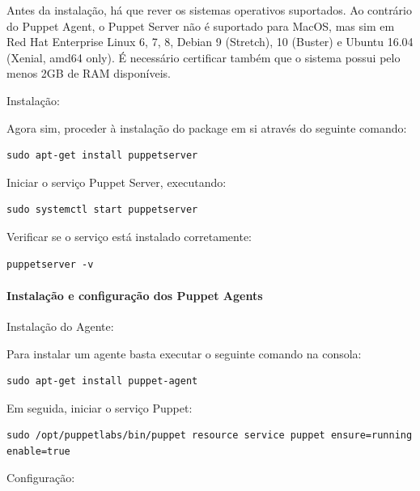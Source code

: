 \documentclass{article}
\begin{document}
Antes da instalação, há que rever os sistemas operativos suportados. Ao contrário do Puppet Agent, o Puppet Server não é suportado para MacOS, mas sim em Red Hat Enterprise Linux 6, 7, 8, Debian 9 (Stretch), 10 (Buster) e Ubuntu 16.04 (Xenial, amd64 only). É necessário certificar também que o sistema possui pelo menos 2GB de RAM disponíveis.

Instalação:

Agora sim, proceder à instalação do package em si através do seguinte comando:
\begin{lstlisting}
sudo apt-get install puppetserver
\end{lstlisting}

Iniciar o serviço Puppet Server, executando:
\begin{lstlisting}
sudo systemctl start puppetserver
\end{lstlisting}

Verificar se o serviço está instalado corretamente:
\begin{lstlisting}
puppetserver -v
\end{lstlisting}

\paragraph{Instalação e configuração dos Puppet Agents}
Instalação do Agente:

Para instalar um agente basta executar o seguinte comando na consola:
\begin{lstlisting}
sudo apt-get install puppet-agent
\end{lstlisting}

Em seguida, iniciar o serviço Puppet:
\begin{lstlisting}
sudo /opt/puppetlabs/bin/puppet resource service puppet ensure=running enable=true
\end{lstlisting}

Configuração:
\end{document}
